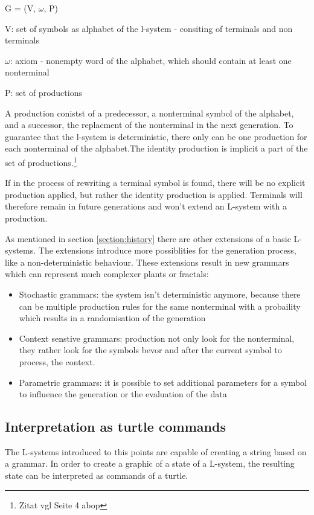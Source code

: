 \documentclass[english]{cpp-hmwk}
\begin{document}
\begin{center}
G = (V, $\omega$, P)
\end{center}

V: set of symbols as alphabet of the l-system - consiting of terminals and non terminals

$\omega$: axiom - nonempty word of the alphabet, which should contain at least one nonterminal

P: set of productions

\medskip
\noindent A production conistst of a predecessor, a nonterminal symbol of the alphabet, and a successor, the replacment of the nonterminal in the next generation.
To guarantee that the l-system is deterministic, there only can be one production for each nonterminal of the alphabet.The identity production is implicit a part of the set of productions.\footnote{Zitat vgl Seite 4 abop}

\medskip

If in the process of rewriting a terminal symbol is found, there will be no explicit production applied, but rather the identity production is applied. Terminals will therefore remain in future generations and won't extend an L-system with a production.

\medskip

\noindent As mentioned in section \ref{section:history} there are other extensions of a basic L-systems. The extensions introduce more possiblities for the generation process, like a non-deterministic behaviour. These extensions result in new grammars which can represent much complexer plants or fractals:

\begin{itemize}
\item Stochastic grammars: the system isn't deterministic anymore, because there can be multiple production rules for the same nonterminal with a probaility which results in a randomisation of the generation
\item Context senstive grammars: production not only look for the nonterminal, they rather look for the symbols bevor and after the current symbol to process, the context.
\item Parametric grammars: it is possible to set additional parameters for a symbol to influence the generation or the evaluation of the data
\end{itemize}

\subsection{Interpretation as turtle commands}
\label{section:turtle}
The L-systems introduced to this points are capable of creating a string based on a grammar. In order to create a graphic of a state of a L-system, the resulting state can be interpreted as commands of a turtle.
\end{document}
